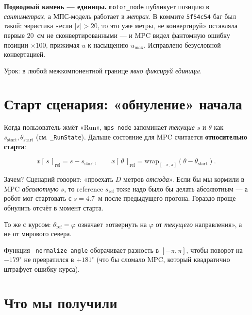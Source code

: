 \begin{warnbox}
\textbf{Подводный камень --- единицы.} \texttt{motor\_node} публикует
позицию в \emph{сантиметрах}, а МПС-модель работает в \emph{метрах}.
В коммите \texttt{5f54c54} баг был такой: эвристика «если $|s| > 20$,
то это уже метры, не конвертируй» оставляла первые 20~см не
сконвертированными --- и MPC видел фантомную ошибку позиции $\times 100$,
прижимая $u$ к насыщению $u_\text{max}$. Исправлено безусловной
конвертацией.

Урок: в любой межкомпонентной границе \emph{явно фиксируй единицы}.
\end{warnbox}

\section{Старт сценария: «обнуление» начала}

Когда пользователь жмёт «Run», \texttt{mps\_node} запоминает \emph{текущие}
$s$ и $\theta$ как $s_\text{start}, \theta_\text{start}$ (см. \texttt{\_RunState}).
Дальше состояние для MPC считается \textbf{относительно старта}:

\begin{equation}
  x[\,s\,]_\text{rel}     = s - s_\text{start},
  \qquad
  x[\,\theta\,]_\text{rel} = \text{wrap}_{[-\pi, \pi]}(\theta - \theta_\text{start}).
  \label{eq:relative_state}
\end{equation}

\begin{ideabox}
Зачем? Сценарий говорит: «проехать $D$ метров \emph{отсюда}». Если бы
мы кормили в MPC \emph{абсолютную} $s$, то reference $s_\text{ref}$
тоже надо было бы делать абсолютным --- а робот мог стартовать с
$s=4.7$~м после предыдущего прогона. Гораздо проще обнулить отсчёт
в момент старта.

То же с курсом: $\theta_\text{ref} = \varphi$ означает «отвернуть на
$\varphi$ от \emph{текущего} направления», а не от мирового севера.
\end{ideabox}

Функция \texttt{\_normalize\_angle} оборачивает разность в $[-\pi, \pi]$,
чтобы поворот на $-179^\circ$ не превратился в $+181^\circ$ (что бы
сломало MPC, который квадратично штрафует ошибку курса).

\section{Что мы получили}

